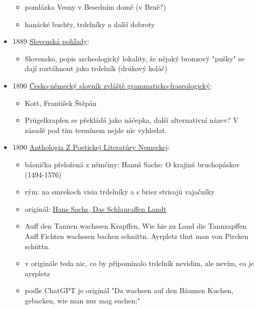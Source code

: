 \begin{itemize}
  \begin{itemize}
  \tightlist
  \item
    pomlázka Vesny v Besedním domě (v Brně?)
  \item
    hanácké buchty, trdelníky a další dobroty
  \end{itemize}
\item
  1889
  \href{https://dikda.snk.sk/view/uuid:1ecf9029-7613-401d-843c-e2938a484970?page=uuid:43b26cf7-af4a-4231-8901-ba41c009c9e7&fulltext=trdeln\%C3\%ADk\%20OR\%20trdeln\%C3\%ADka\%20OR\%20trdeln\%C3\%ADku}{Slovenská
  pohľady}:

  \begin{itemize}
  \tightlist
  \item
    Slovensko, popis archeologický lokality, že nějaký bronzový "pušky"
    se dají roztáhnout jako trdelník (drúkový koláč)
  \end{itemize}
\item
  1890
  \href{https://ndk.cz/view/uuid:18b40310-07ad-11dd-8ccf-000d606f5dc6?page=uuid\%3Aae6c9544-ef09-495a-bf20-9e525fdb15b2&fulltext=Pr\%C3\%BCgelkrapfen}{Česko-německý
  slovník zvláště grammaticko-fraseologický}:

  \begin{itemize}
  \tightlist
  \item
    Kott, František Štěpán
  \item
    Prügelkrapfen se překládá jako náčepka, další alternativní název? V
    zásadě pod tim termínem nejde nic vyhledat.
  \end{itemize}
\item
  1890
  \href{https://dikda.snk.sk/uuid/uuid:f747b566-df1c-4c50-a3a8-7817d299de0e}{Anthologia
  Z Poetickej Literatúry Nemeckej}:

  \begin{itemize}
  \tightlist
  \item
    básnička přeložená z němčiny: Hanuš Sachs: O krajině bruchopáskov
    (1494-1576)
  \item
    rým: na smrekoch visia trdelníky \textbar{} a s briez strisajů
    vajačníky
  \item
    originál:
    \href{https://www.poemhunter.com/poem/das-schlauraffen-landt/}{Hans
    Sachs, Das Schlauraffen Landt}
  \item
    Auff den Tannen wachssen Krapffen, \textbar{} Wie hie zu Land die
    Tannzapffen \textbar{} Auff Fichten wachssen bachen schnittn.
    \textbar{} Ayrpletz thut man von Pircken schüttn.
  \item
    v originále teda nic, co by připomínalo trdelník nevidim, ale nevím,
    co je ayrpletz
  \item
    podle ChatGPT je originál "Da wachsen auf den Bäumen Kuchen,
    \textbar{} gebacken, wie man nur mag suchen;"


\end{itemize}
\end{itemize}
